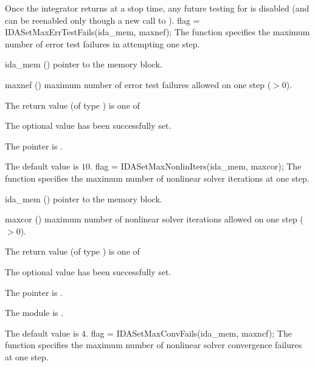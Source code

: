 {{  Once the integrator returns at a stop time, any future testing for 
  is disabled (and can be reenabled only though a new call to ).
}
{
flag = IDASetMaxErrTestFails(ida\_mem, maxnef);
}
{
  The function  specifies the
  maximum number of error test failures in attempting one step.
}
{
  \begin{args}
  \item[ida\_mem] ()
    pointer to the {\ida} memory block.
  \item[maxnef] ()
    maximum number of error test failures allowed on one step ($>0$).
  \end{args}
}
{
  The return value  (of type ) is one of
  \begin{args}
  \item[\Id{IDA\_SUCCESS}]
    The optional value has been successfully set.
  \item[\Id{IDA\_MEM\_NULL}]
    The  pointer is .
  \end{args}
}
{
  The default value is $10$.
}
{
flag = IDASetMaxNonlinIters(ida\_mem, maxcor);
}
{
  The function  specifies the maximum
  number of nonlinear solver iterations at one step.
}
{
  \begin{args}
  \item[ida\_mem] ()
    pointer to the {\ida} memory block.
  \item[maxcor] ()
    maximum number of nonlinear solver iterations allowed on one step ($>0$).
  \end{args}
}
{
  The return value  (of type ) is one of
  \begin{args}
  \item[\Id{IDA\_SUCCESS}]
    The optional value has been successfully set.
  \item[\Id{IDA\_MEM\_NULL}]
    The  pointer is .
  \item[\Id{IDA\_MEM\_FAIL}]
    The {\sunnonlinsol} module is .
  \end{args}
}
{
  The default value is $4$.
}
{
flag = IDASetMaxConvFails(ida\_mem, maxncf);
}
{
  The function  specifies the
  maximum number of nonlinear solver convergence failures at one step.
}
{
  \begin{args}

\end{args}}}
